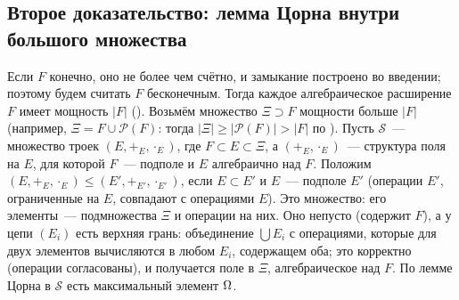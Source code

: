 \subsection*{Второе доказательство: лемма Цорна внутри большого множества}

Если $F$ конечно, оно не более чем счётно, и замыкание построено во введении; поэтому будем считать $F$ бесконечным. Тогда каждое
алгебраическое расширение $F$ имеет мощность $|F|$ (). Возьмём множество $\Xi\supset F$ мощности больше $|F|$
(например, $\Xi=F\cup\mathcal P(F)$: тогда $|\Xi|\ge|\mathcal P(F)|>|F|$ по ). Пусть $\mathcal S$~--- множество троек $(E,+_E,\cdot_E)$, где
$F\subset E\subset\Xi$, а $(+_E,\cdot_E)$~--- структура поля на $E$, для которой $F$~--- подполе и $E$ алгебраично над
$F$. Положим $(E,+_E,\cdot_E)\le(E',+_{E'},\cdot_{E'})$, если $E\subset E'$ и $E$~--- подполе $E'$ (операции $E'$,
ограниченные на $E$, совпадают с операциями $E$). Это множество: его элементы~--- подмножества $\Xi$ и операции на них.
Оно непусто (содержит $F$), а у цепи $(E_i)$ есть верхняя грань: объединение $\bigcup E_i$ с операциями, которые для
двух элементов вычисляются в любом $E_i$, содержащем оба; это корректно (операции согласованы), и получается поле в
$\Xi$, алгебраическое над $F$. По лемме Цорна в $\mathcal S$ есть максимальный элемент $\Omega$.

